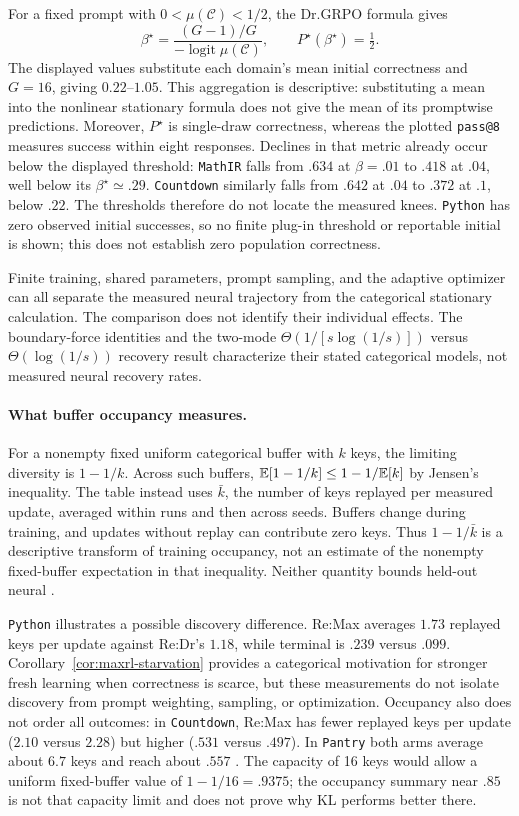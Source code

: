 For a fixed prompt with $0<\mu(\mathcal C)<1/2$, the Dr.GRPO formula gives
\[
  \beta^\star=\frac{(G-1)/G}{-\operatorname{logit}\mu(\mathcal C)},
  \qquad P^\star(\beta^\star)=\tfrac12.
\]
The displayed values substitute each domain's mean initial correctness
and $G=16$, giving $0.22$--$1.05$.
This aggregation is descriptive: substituting a mean into the nonlinear
stationary formula does not give the mean of its promptwise predictions.
Moreover, $P^\star$ is single-draw correctness, whereas the plotted
\texttt{pass@8} measures success within eight responses. Declines in that
metric already occur below the displayed threshold: \texttt{MathIR} falls from
$.634$ at $\beta=.01$ to $.418$ at $.04$, well below its
$\beta^\star\simeq.29$. \texttt{Countdown} similarly falls from $.642$ at $.04$
to $.372$ at $.1$, below $.22$. The thresholds therefore do not locate
the measured knees. \texttt{Python} has zero observed initial successes, so no
finite plug-in threshold or reportable initial \pmd{} is shown; this
does not establish zero population correctness.

Finite training, shared parameters, prompt sampling, and the adaptive
optimizer can all separate the measured neural trajectory from the
categorical stationary calculation. The comparison does not identify their
individual effects. The boundary-force identities and the two-mode
$\Theta(1/[s\log(1/s)])$ versus $\Theta(\log(1/s))$ recovery result
characterize their stated categorical models, not measured neural recovery
rates.

\paragraph{What buffer occupancy measures.}
For a nonempty fixed uniform categorical buffer with $k$ keys, the limiting
diversity is $1-1/k$. Across such buffers,
$\mathbb E[1-1/k]\le1-1/\mathbb E[k]$ by Jensen's inequality. The table instead uses
$\bar k$, the number of keys replayed per measured update, averaged within
runs and then across seeds. Buffers change during training, and updates
without replay can contribute zero keys. Thus $1-1/\bar k$ is a
descriptive transform of training occupancy, not an estimate of the
nonempty fixed-buffer expectation in that inequality. Neither quantity
bounds held-out neural \pmd{}.

\texttt{Python} illustrates a possible discovery difference. Re:Max averages
$1.73$ replayed keys per update against Re:Dr's $1.18$, while terminal
\pmd{} is $.239$ versus $.099$. Corollary~\ref{cor:maxrl-starvation}
provides a categorical motivation for stronger fresh learning when
correctness is scarce, but these measurements do not isolate discovery
from prompt weighting, sampling, or optimization. Occupancy also does not
order all outcomes: in \texttt{Countdown}, Re:Max has fewer replayed keys per
update ($2.10$ versus $2.28$) but higher \pmd{} ($.531$ versus $.497$).
In \texttt{Pantry} both arms average about $6.7$ keys and reach about $.557$ \pmd{}.
The capacity of 16 keys would allow a uniform fixed-buffer value of
$1-1/16=.9375$; the occupancy summary near $.85$ is not that capacity
limit and does not prove why KL performs better there.

